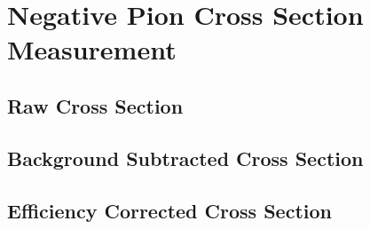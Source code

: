 \chapter{Negative Pion Cross Section Measurement}\label{ch:PionXS}
\section{Raw Cross Section}\label{ch:PionXSRaw}

\section{Background Subtracted Cross Section}\label{ch:PionXSBkgSub}

\section{Efficiency Corrected Cross Section}\label{ch:PionXSEffCorr}